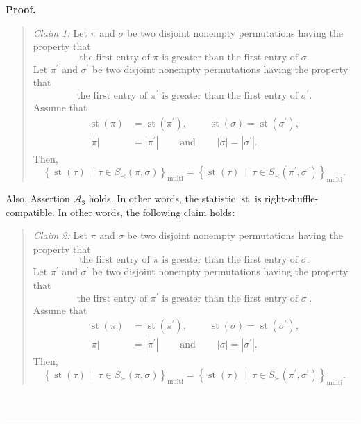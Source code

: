 \documentclass[numbers=enddot,12pt,final,onecolumn,notitlepage]{scrartcl}%
\theoremstyle{definition}
\newenvironment{statement}{\begin{quote}}{\end{quote}}
\newenvironment{proof}[1][Proof]{\noindent\textbf{#1.} }{\ \rule{0.5em}{0.5em}}
\begin{document}
\begin{proof}
\begin{statement}
\textit{Claim 1:} Let $\pi$ and $\sigma$ be two disjoint nonempty permutations
having the property that%
\[
\text{the first entry of }\pi\text{ is greater than the first entry of }%
\sigma.
\]
Let $\pi^{\prime}$ and $\sigma^{\prime}$ be two disjoint nonempty permutations
having the property that%
\[
\text{the first entry of }\pi^{\prime}\text{ is greater than the first entry
of }\sigma^{\prime}.
\]
Assume that%
\begin{align*}
\operatorname*{st}\left(  \pi\right)   &  =\operatorname*{st}\left(
\pi^{\prime}\right)  ,\ \ \ \ \ \ \ \ \ \ \operatorname*{st}\left(
\sigma\right)  =\operatorname*{st}\left(  \sigma^{\prime}\right)  ,\\
\left\vert \pi\right\vert  &  =\left\vert \pi^{\prime}\right\vert
\ \ \ \ \ \ \ \ \ \ \text{and}\ \ \ \ \ \ \ \ \ \ \left\vert \sigma\right\vert
=\left\vert \sigma^{\prime}\right\vert .
\end{align*}
Then,
\[
\left\{  \operatorname*{st}\left(  \tau\right)  \ \mid\ \tau\in S_{\prec
}\left(  \pi,\sigma\right)  \right\}  _{\operatorname*{multi}}=\left\{
\operatorname*{st}\left(  \tau\right)  \ \mid\ \tau\in S_{\prec}\left(
\pi^{\prime},\sigma^{\prime}\right)  \right\}  _{\operatorname*{multi}}.
\]

\end{statement}

Also, Assertion $\mathcal{A}_{3}$ holds. In other words, the statistic
$\operatorname*{st}$ is right-shuffle-compatible. In other words, the
following claim holds:

\begin{statement}
\textit{Claim 2:} Let $\pi$ and $\sigma$ be two disjoint nonempty permutations
having the property that%
\[
\text{the first entry of }\pi\text{ is greater than the first entry of }%
\sigma.
\]
Let $\pi^{\prime}$ and $\sigma^{\prime}$ be two disjoint nonempty permutations
having the property that%
\[
\text{the first entry of }\pi^{\prime}\text{ is greater than the first entry
of }\sigma^{\prime}.
\]
Assume that%
\begin{align*}
\operatorname*{st}\left(  \pi\right)   &  =\operatorname*{st}\left(
\pi^{\prime}\right)  ,\ \ \ \ \ \ \ \ \ \ \operatorname*{st}\left(
\sigma\right)  =\operatorname*{st}\left(  \sigma^{\prime}\right)  ,\\
\left\vert \pi\right\vert  &  =\left\vert \pi^{\prime}\right\vert
\ \ \ \ \ \ \ \ \ \ \text{and}\ \ \ \ \ \ \ \ \ \ \left\vert \sigma\right\vert
=\left\vert \sigma^{\prime}\right\vert .
\end{align*}
Then,
\[
\left\{  \operatorname*{st}\left(  \tau\right)  \ \mid\ \tau\in S_{\succ
}\left(  \pi,\sigma\right)  \right\}  _{\operatorname*{multi}}=\left\{
\operatorname*{st}\left(  \tau\right)  \ \mid\ \tau\in S_{\succ}\left(
\pi^{\prime},\sigma^{\prime}\right)  \right\}  _{\operatorname*{multi}}.
\]


\end{statement}
\end{proof}
\end{document}
